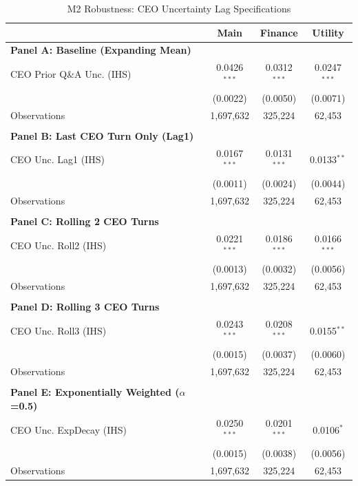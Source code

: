 \documentclass[11pt]{article}
\begin{document}
\newpage

\begin{table}[htbp]
\centering
\caption{M2 Robustness: CEO Uncertainty Lag Specifications}
\label{tab:m2_lags}
\footnotesize
\setlength{\tabcolsep}{6pt}
\begin{tabular}{lccc}
\toprule
 & Main & Finance & Utility \\
\midrule
\textbf{Panel A: Baseline (Expanding Mean)} \\
CEO Prior Q\&A Unc. (IHS) & 0.0426$^{***}$ & 0.0312$^{***}$ & 0.0247$^{***}$ \\
 & (0.0022) & (0.0050) & (0.0071) \\
Observations & 1,697,632 & 325,224 & 62,453 \\
 &  &  & \\
\textbf{Panel B: Last CEO Turn Only (Lag1)} \\
CEO Unc. Lag1 (IHS) & 0.0167$^{***}$ & 0.0131$^{***}$ & 0.0133$^{**}$ \\
 & (0.0011) & (0.0024) & (0.0044) \\
Observations & 1,697,632 & 325,224 & 62,453 \\
 &  &  & \\
\textbf{Panel C: Rolling 2 CEO Turns} \\
CEO Unc. Roll2 (IHS) & 0.0221$^{***}$ & 0.0186$^{***}$ & 0.0166$^{***}$ \\
 & (0.0013) & (0.0032) & (0.0056) \\
Observations & 1,697,632 & 325,224 & 62,453 \\
 &  &  & \\
\textbf{Panel D: Rolling 3 CEO Turns} \\
CEO Unc. Roll3 (IHS) & 0.0243$^{***}$ & 0.0208$^{***}$ & 0.0155$^{**}$ \\
 & (0.0015) & (0.0037) & (0.0060) \\
Observations & 1,697,632 & 325,224 & 62,453 \\
 &  &  & \\
\textbf{Panel E: Exponentially Weighted ($\alpha$=0.5)} \\
CEO Unc. ExpDecay (IHS) & 0.0250$^{***}$ & 0.0201$^{***}$ & 0.0106$^{*}$ \\
 & (0.0015) & (0.0038) & (0.0056) \\
Observations & 1,697,632 & 325,224 & 62,453 \\

\end{tabular}
\end{table}
\end{document}
